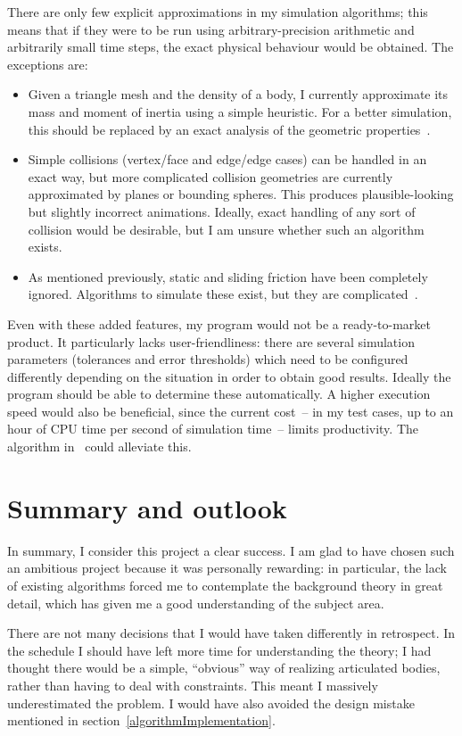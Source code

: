 There are only few explicit approximations in my simulation algorithms; this means that if they
were to be run using arbitrary-precision arithmetic and arbitrarily small time steps, the exact
physical behaviour would be obtained. The exceptions are:
\begin{itemize}
\item Given a triangle mesh and the density of a body, I currently approximate its mass and moment
    of inertia using a simple heuristic. For a better simulation, this should be
    replaced by an exact analysis of the geometric properties~\cite{Mirtich:96}.
\item Simple collisions (vertex/face and edge/edge cases) can be handled in an exact way, but
    more complicated collision geometries are currently approximated by planes or bounding
    spheres. This produces plausible-looking but slightly incorrect animations. Ideally,
    exact handling of any sort of collision would be desirable, but I am unsure whether such
    an algorithm exists.
\item As mentioned previously, static and sliding friction have been completely ignored.
    Algorithms to simulate these exist, but they are complicated~\cite{Baraff:PhD}.
\end{itemize}

Even with these added features, my program would not be a ready-to-market product. It particularly
lacks user-friendliness: there are several simulation parameters (tolerances and error thresholds)
which need to be configured differently depending on the situation in order to obtain good
results. Ideally the program should be able to determine these automatically. A higher execution
speed would also be beneficial, since the current cost~-- in my test cases, up to an hour of CPU
time per second of simulation time~-- limits productivity. The algorithm in~\cite{Baraff:96}
could alleviate this.

\section{Summary and outlook}

In summary, I consider this project a clear success. I am glad to have chosen such an ambitious
project because it was personally rewarding: in particular, the lack of existing algorithms
forced me to contemplate the background theory in great detail, which has given me a good
understanding of the subject area.

There are not many decisions that I would have taken differently in retrospect. In the schedule I
should have left more time for understanding the theory; I had thought there would be a simple,
``obvious'' way of realizing articulated bodies, rather than having to deal with constraints. This
meant I massively underestimated the problem. I would have also avoided the design mistake
mentioned in section~\ref{algorithmImplementation}.

